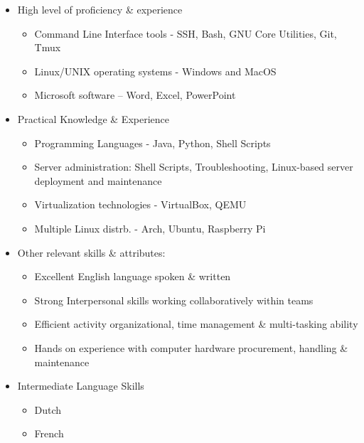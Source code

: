 \begin{cvparagraph}



\begin{multicols}{2}


	\vspace{-\topsep}
	\begin{itemize}
		\setlength{\parskip}{0pt}
		\setlength{\itemsep}{0pt plus 1pt}

		\item{High level of proficiency \& experience}
			\begin{itemize}
					\item{Command Line Interface tools - SSH, Bash, GNU Core Utilities, Git, Tmux}
					\item{Linux/UNIX operating systems - Windows and MacOS}
					\item{Microsoft software – Word, Excel, PowerPoint}
			\end{itemize}

		\item{Practical Knowledge \& Experience}
			\begin{itemize}
				\item{Programming Languages - Java, Python, Shell Scripts}
				\item{Server administration: Shell Scripts, Troubleshooting, Linux-based server deployment and maintenance}
				\item{Virtualization technologies - VirtualBox, QEMU}
				\item{Multiple Linux distrb. - Arch, Ubuntu, Raspberry Pi}
			\end{itemize}
		\item{Other relevant skills \& attributes:}
			\begin{itemize}
				\item{Excellent English language spoken \& written}
				\item{Strong Interpersonal skills working collaboratively within teams}
				\item{Efficient activity organizational, time management \& multi-tasking ability}
				\item{Hands on experience with computer hardware procurement, handling \& maintenance}
			\end{itemize}
		\item{Intermediate Language Skills}
			\begin{itemize}
				\item{Dutch}
				\item{French}
			\end{itemize}


\end{itemize}
\end{multicols}
\end{cvparagraph}
